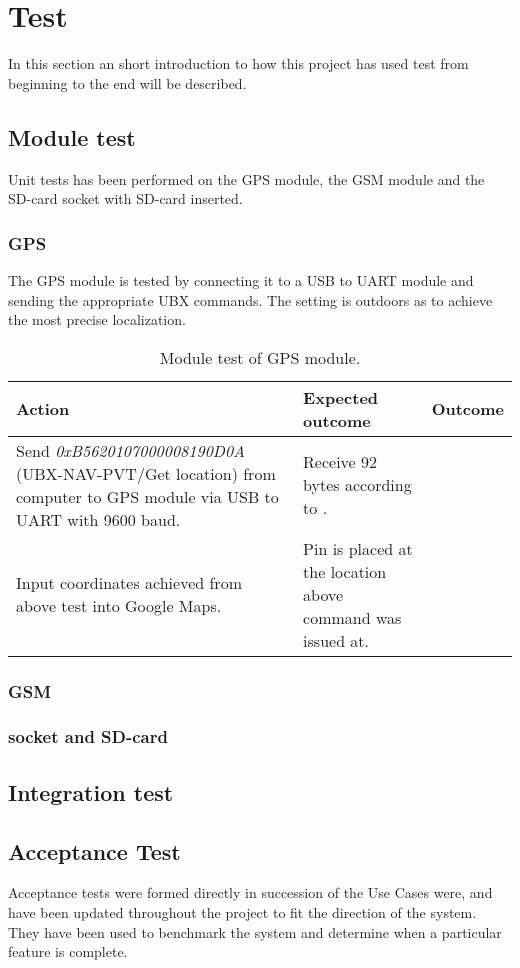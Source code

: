 
\chapter{Test}
In this section an short introduction to how this project has used test from beginning to the end will be described.

\section{Module test}
Unit tests has been performed on the \GPS GPS module, the \SARA GSM module and the \SDsock SD-card socket with SD-card inserted.

\subsection{GPS \GPS}
The GPS module is tested by connecting it to a USB to UART module and sending the appropriate UBX commands. The setting is outdoors as to achieve the most precise localization.

\begin{table}
	\centering
	\begin{tabularx}{\textwidth}{p{4.3cm} X X}
		\toprule
		\textbf{Action} & \textbf{Expected outcome} & \textbf{Outcome} \\
		\midrule
		Send \textit{0xB5620107000008190D0A} (UBX-NAV-PVT/Get location) from computer to GPS module via USB to UART with \num{9600} baud. & Receive \num{92} bytes according to \cite[p.~160-161]{NEO7_proto}. & \\
		\midrule
		Input coordinates achieved from above test into Google Maps. & Pin is placed at the location above command was issued at. & \\
		\bottomrule
	\end{tabularx}
	\caption{Module test of \GPS GPS module.}
	\label{AT:GPS}
\end{table}

\subsection{GSM \SARA}

\subsection{\SDsock socket and SD-card}

\section{Integration test}


\section{Acceptance Test}
Acceptance tests were formed directly in succession of the Use Cases were, and have been updated throughout the project to fit the direction of the system. They have been used to benchmark the system and determine when a particular feature is complete.

\FloatBarrier